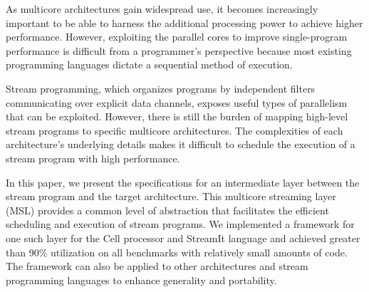 %
%
%
%
%
%
% 
% 
%

As multicore architectures gain widespread use, it becomes increasingly important to be able to harness the
additional processing power to achieve higher performance. However, exploiting the parallel cores to
improve single-program performance is difficult from a
programmer's perspective because most existing programming languages dictate a sequential method of execution.

Stream programming, which organizes programs by independent filters communicating over explicit data channels, 
exposes useful types of parallelism that can be exploited. However, there is still the burden of mapping high-level stream programs to
specific multicore architectures. The complexities of each architecture's underlying details makes it difficult to
schedule the execution of a stream program with high performance.

In this paper, we present the specifications for an intermediate layer between the stream program and the target architecture.
This multicore streaming layer (MSL) provides a common level of abstraction that facilitates the efficient scheduling and
execution of stream programs. We implemented a framework for one such layer for the Cell processor and StreamIt language
and achieved greater than
90\% utilization on all benchmarks with relatively small amounts of code. The framework can also be applied to other
architectures and stream programming languages to enhance generality and portability.



